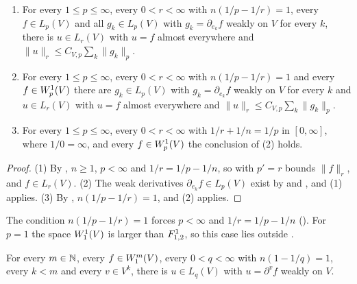 \begin{theorem}[$\Sob{1}{p} \hookrightarrow L_r$ for $1/r = 1/p - 1/n$]
\label{thm:sobolev-one-embedding}
\leanok
{}
\begin{enumerate}
  \item For every $1 \leq p \leq \infty$, every $0 < r < \infty$ with $n(1/p - 1/r) = 1$, every
    $f \in L_p(V)$ and all $g_k \in L_p(V)$ with $g_k = \partial_{e_k} f$ weakly on $V$ for
    every $k$, there is $u \in L_r(V)$ with $u = f$ almost everywhere and
    $\|u\|_r \leq C_{V,p} \sum_k \|g_k\|_p$.
  \item For every $1 \leq p \leq \infty$, every $0 < r < \infty$ with $n(1/p - 1/r) = 1$ and
    every $f \in W^{1}_{p}(V)$ there are $g_k \in L_p(V)$ with $g_k = \partial_{e_k} f$ weakly
    on $V$ for every $k$ and $u \in L_r(V)$ with $u = f$ almost everywhere and
    $\|u\|_r \leq C_{V,p} \sum_k \|g_k\|_p$.
  \item For every $1 \leq p \leq \infty$, every $0 < r < \infty$ with $1/r + 1/n = 1/p$ in
    $[0, \infty]$, where $1/0 = \infty$, and every $f \in W^{1}_{p}(V)$ the conclusion of (2)
    holds.
\end{enumerate}
\end{theorem}

\begin{proof}
\leanok
(1) By , $n \geq 1$, $p < \infty$ and $1/r = 1/p - 1/n$, so
 with $p' = r$ bounds $\|f\|_r$, and $f \in L_r(V)$. (2) The weak derivatives
$\partial_{e_k} f \in L_p(V)$ exist by  and
, and (1) applies. (3) By ,
$n(1/p - 1/r) = 1$, and (2) applies.
\end{proof}

The condition $n(1/p - 1/r) = 1$ forces $p < \infty$ and $1/r = 1/p - 1/n$
(). For $p = 1$ the space $W^{1}_{1}(V)$ is larger than $F^{1}_{1,2}$,
so this case lies outside .

\begin{lemma}
\label{lem:sobolev-l1-derivatives}
\leanok
{}
For every $m \in \mathbb{N}$, every $f \in W^{m}_{1}(V)$, every $0 < q < \infty$ with
$n(1 - 1/q) = 1$, every $k < m$ and every $v \in V^k$, there is $u \in L_q(V)$ with
$u = \partial^v f$ weakly on $V$.
\end{lemma}


